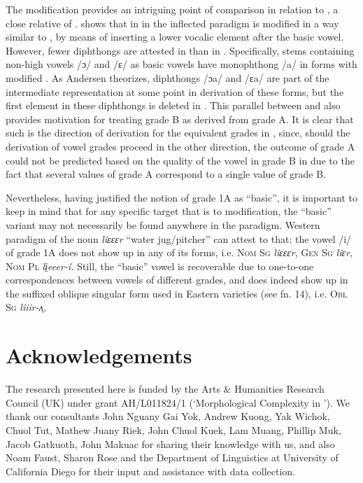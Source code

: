 \documentclass[output=paper
,newtxmath
,modfonts
,nonflat]{langsci/langscibook}
\begin{document}
The  modification provides an intriguing point of comparison in relation to , a close relative of . \citet{Andersen1993} shows that in   in the inflected paradigm is modified in a way similar to , by means of inserting a lower vocalic element after the basic vowel.  However, fewer diphthongs are attested in  than in .  Specifically, stems containing non-high vowels /ɔ/ and /ɛ/ as basic vowels have monophthong /a/ in forms with modified . As Andersen theorizes, diphthongs /ɔa/ and /ɛa/ are part of the intermediate representation at some point in derivation of these forms, but the first element in these diphthongs is deleted in .  This parallel between  and  also provides motivation for treating grade B as derived from grade A.  It is clear that such is the direction of derivation for the equivalent grades in , since, should the derivation of vowel grades proceed in the other direction, the outcome of grade A could not be predicted based on the quality of the vowel in grade B in  due to the fact that several values of grade A correspond to a single value of grade B.  

Nevertheless, having justified the notion of grade 1A as “basic”, it is important to keep in mind that for any specific target that is  to modification, the “basic” variant may not necessarily be found anywhere in the paradigm.  Western  paradigm of the noun \textit{lîɛɛɛr} “water jug/pitcher” can attest to that: the vowel /i/ of grade 1A does not show up in any of its forms, i.e. \textsc{Nom Sg} \textit{lîɛɛɛr}, \textsc{Gen Sg} \textit{lîɛr,} \textsc{Nom Pl} \textit{li̤eeer-í.} Still, the “basic” vowel is recoverable due to one-to-one correspondences between vowels of different grades, and does indeed show up in the suffixed oblique singular form used in Eastern  varieties (see fn. 14), i.e. \textsc{Obl Sg} \textit{lîiir-ʌ̤.}  

\section*{Acknowledgements}

The research presented here is funded by the Arts \& Humanities Research Council (UK) under grant AH/L011824/1 (‘Morphological Complexity in ’).  We thank our  consultants John Nguany Gai Yok, Andrew Kuong, Yak Wichok, Chuol Tut, Mathew Juany Riek, John Chuol Kuek, Lam Muang, Phillip Muk, Jacob Gatkuoth, John Makuac for sharing their knowledge with us, and also Noam Faust, Sharon Rose and the Department of Linguistics at University of California  Diego for their input and assistance with data collection.
\end{document}

